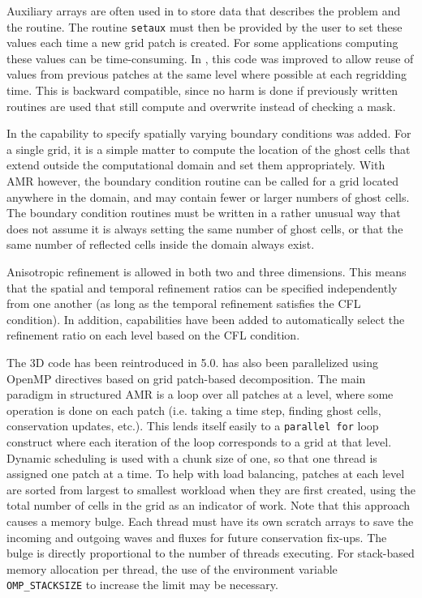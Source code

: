 Auxiliary arrays are often used in \clawpack to store data that
describes the problem and the routine.
The routine \texttt{setaux} must then be provided by the user to set these values each time a
new grid patch is created.  For some applications computing these values can be time-consuming.  In ,
this code was improved to allow reuse of values from previous patches at
the same level where possible at each regridding time.
This is backward compatible, since no harm is done if previously
written routines are used that still compute and overwrite instead of
checking a mask.

In  the capability to specify spatially varying boundary conditions
was added. For a single grid, it is a simple matter to
compute the location of the ghost cells that extend
outside the computational domain and set them appropriately.
With AMR however, the boundary condition routine can be called
for a grid located anywhere in the domain, and may contain fewer
or larger numbers of ghost cells. The boundary condition routines
must be written in a rather unusual way that does not assume it
is always setting the same number of ghost cells, or that the
same number of reflected cells inside the domain always exist.

Anisotropic refinement is allowed in both two and three dimensions.  This means that the spatial and temporal refinement ratios can be specified independently from one another (as long as the temporal refinement satisfies the CFL condition).
In addition, capabilities have been added to automatically select the
refinement ratio on each level based on the CFL condition.

The 3D \amrclaw code has been reintroduced in 5.0. \amrclaw has also been
parallelized using OpenMP directives based on grid patch-based decomposition.
The main paradigm in structured AMR is a loop over all patches at a level, where
some operation is done on each patch (i.e. taking a time step, finding ghost
cells, conservation updates, etc.).  This lends itself easily to a {\tt parallel
for} loop construct where each iteration of the loop corresponds to a grid at
that level. Dynamic scheduling is used with a chunk size of one, so that one
thread is assigned one patch at a time. To help with load balancing, patches at
each level are sorted from largest to smallest workload when they are first
created, using the total number of cells in the grid as an indicator of work.
Note that this approach causes a memory bulge. Each thread must have its own
scratch arrays to save the incoming and outgoing waves and fluxes for future
conservation fix-ups. The bulge is directly proportional to the number of
threads executing. For stack-based memory allocation per thread, the use of the
environment variable {\tt OMP\_STACKSIZE} to increase the limit may be
necessary.

